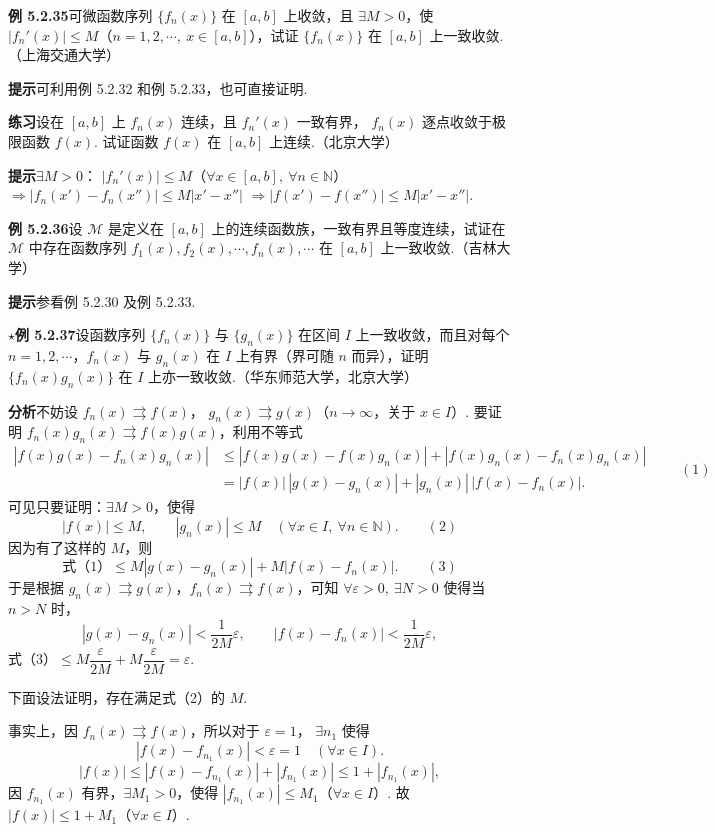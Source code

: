 \documentclass[UTF8, 12pt, fontset=fandol, oneside]{ctexart}
\begin{document}
\noindent\textbf{例 5.2.35}\quad 可微函数序列 $\{f_n(x)\}$ 在 $[a,b]$ 上收敛，且
$\exists M>0$，使 $|f_n'(x)|\le M$（$n=1,2,\cdots,\ x\in[a,b]$），试证
$\{f_n(x)\}$ 在 $[a,b]$ 上一致收敛.（上海交通大学）

\noindent\textbf{提示}\quad 可利用例 5.2.32 和例 5.2.33，也可直接证明.

\noindent\textbf{练习}\quad 设在 $[a,b]$ 上 $f_n(x)$ 连续，且 $f_n'(x)$ 一致有界，
$f_n(x)$ 逐点收敛于极限函数 $f(x)$. 试证函数 $f(x)$ 在 $[a,b]$ 上连续.（北京大学）

\noindent\textbf{提示}\quad $\exists M>0$：
$|f_n'(x)|\le M$（$\forall x\in[a,b],\ \forall n\in\mathbb N$）
$\Rightarrow |f_n(x')-f_n(x'')|\le M|x'-x''|$
$\Rightarrow |f(x')-f(x'')|\le M|x'-x''|$.

\noindent\textbf{例 5.2.36}\quad 设 $\mathcal M$ 是定义在 $[a,b]$ 上的连续函数族，一致有界且等度连续，试证在
$\mathcal M$ 中存在函数序列 $f_1(x),f_2(x),\cdots,f_n(x),\cdots$ 在
$[a,b]$ 上一致收敛.（吉林大学）

\noindent\textbf{提示}\quad 参看例 5.2.30 及例 5.2.33.

\noindent\textbf{$\star$例 5.2.37}\quad 设函数序列 $\{f_n(x)\}$ 与 $\{g_n(x)\}$ 在区间 $I$ 上一致收敛，而且对每个
$n=1,2,\cdots$，$f_n(x)$ 与 $g_n(x)$ 在 $I$ 上有界（界可随 $n$ 而异），证明
$\{f_n(x)g_n(x)\}$ 在 $I$ 上亦一致收敛.（华东师范大学，北京大学）

\noindent\textbf{分析}\quad 不妨设 $f_n(x)\rightrightarrows f(x)$，
$g_n(x)\rightrightarrows g(x)$（$n\to\infty$，关于 $x\in I$）. 要证明
$f_n(x)g_n(x)\rightrightarrows f(x)g(x)$，利用不等式
\[
\begin{aligned}
  |f(x)g(x)-f_n(x)g_n(x)|
  &\le |f(x)g(x)-f(x)g_n(x)|
    +|f(x)g_n(x)-f_n(x)g_n(x)|\\
  &=|f(x)|\,|g(x)-g_n(x)|+|g_n(x)|\,|f(x)-f_n(x)|.
\end{aligned}
\qquad(1)
\]
可见只要证明：$\exists M>0$，使得
\[
  |f(x)|\le M,\qquad |g_n(x)|\le M\quad(\forall x\in I,\ \forall n\in\mathbb N).
\qquad(2)
\]
因为有了这样的 $M$，则
\[
  \text{式（1）}\le M|g(x)-g_n(x)|+M|f(x)-f_n(x)|.
\qquad(3)
\]
于是根据 $g_n(x)\rightrightarrows g(x)$，$f_n(x)\rightrightarrows f(x)$，可知
$\forall\varepsilon>0,\ \exists N>0$ 使得当 $n>N$ 时，
\[
  |g(x)-g_n(x)|<\frac1{2M}\varepsilon,\qquad
  |f(x)-f_n(x)|<\frac1{2M}\varepsilon,
\]
式（3）$\le M\dfrac{\varepsilon}{2M}+M\dfrac{\varepsilon}{2M}=\varepsilon$.

下面设法证明，存在满足式（2）的 $M$.

事实上，因 $f_n(x)\rightrightarrows f(x)$，所以对于 $\varepsilon=1$，
$\exists n_1$ 使得
\[
  |f(x)-f_{n_1}(x)|<\varepsilon=1\quad(\forall x\in I).
\]
\[
  |f(x)|\le |f(x)-f_{n_1}(x)|+|f_{n_1}(x)|\le1+|f_{n_1}(x)|,
\]
因 $f_{n_1}(x)$ 有界，$\exists M_1>0$，使得
$|f_{n_1}(x)|\le M_1$（$\forall x\in I$）. 故
$|f(x)|\le1+M_1$（$\forall x\in I$）.
\end{document}

